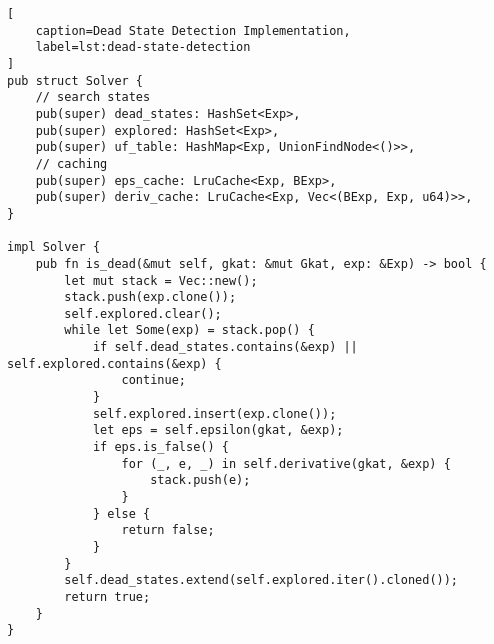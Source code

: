 \documentclass[conference]{IEEEtran}
\begin{document}
\begin{onecolumn}
\begin{lstlisting}[
    caption=Dead State Detection Implementation,
    label=lst:dead-state-detection
]
pub struct Solver {
    // search states
    pub(super) dead_states: HashSet<Exp>,
    pub(super) explored: HashSet<Exp>,
    pub(super) uf_table: HashMap<Exp, UnionFindNode<()>>,
    // caching
    pub(super) eps_cache: LruCache<Exp, BExp>,
    pub(super) deriv_cache: LruCache<Exp, Vec<(BExp, Exp, u64)>>,
}

impl Solver {
    pub fn is_dead(&mut self, gkat: &mut Gkat, exp: &Exp) -> bool {
        let mut stack = Vec::new();
        stack.push(exp.clone());
        self.explored.clear();
        while let Some(exp) = stack.pop() {
            if self.dead_states.contains(&exp) || self.explored.contains(&exp) {
                continue;
            }
            self.explored.insert(exp.clone());
            let eps = self.epsilon(gkat, &exp);
            if eps.is_false() {
                for (_, e, _) in self.derivative(gkat, &exp) {
                    stack.push(e);
                }
            } else {
                return false;
            }
        }
        self.dead_states.extend(self.explored.iter().cloned());
        return true;
    }
}
\end{lstlisting}
\end{onecolumn}
\end{document}
